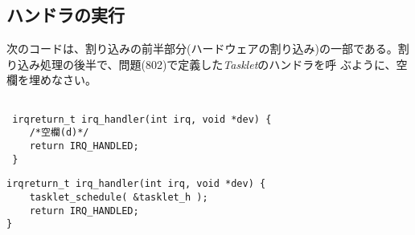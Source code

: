 \documentclass[a4j,9pt]{jsarticle}
\begin{document}
\subsection{ハンドラの実行}
\begin{screen}
次のコードは、割り込みの前半部分(ハードウェアの割り込み)の一部である。割
 り込み処理の後半で、問題(802)で定義した{\itshape Tasklet}のハンドラを呼
 ぶように、空欄を埋めなさい。
\begin{lstlisting}
 
 irqreturn_t irq_handler(int irq, void *dev) {
    /*空欄(d)*/
    return IRQ_HANDLED;
 }
\end{lstlisting}
\end{screen}

\begin{lstlisting}
irqreturn_t irq_handler(int irq, void *dev) {
    tasklet_schedule( &tasklet_h );
    return IRQ_HANDLED;
}
\end{lstlisting}
\end{document}
